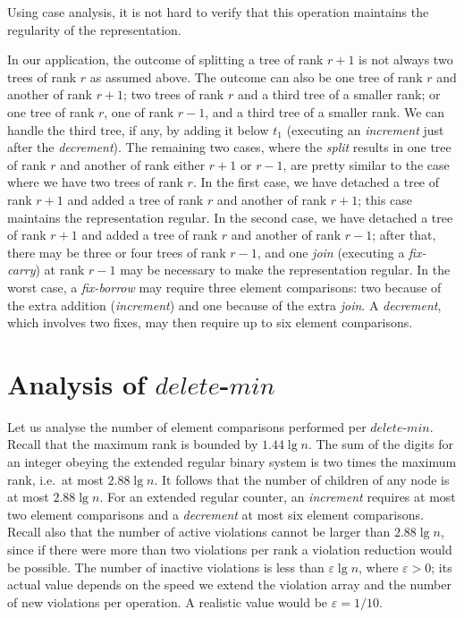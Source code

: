 \documentclass{llncs}
\newcommand{\Deletemin}{\mbox{$\mathit{delete}$\mbox{\rm -}$\mathit{min}$}}
\begin{document}
\noindent
Using case analysis, it is not hard to verify that this operation maintains the
regularity of the representation.

In our application, the outcome of splitting a tree of rank $r+1$ 
is not always two trees of rank $r$ as assumed above. The
outcome can also be one tree of rank $r$ and another of rank $r+1$;
two trees of rank $r$ and a third tree of a smaller rank; or one
tree of rank $r$, one of rank $r-1$, and a third tree of a smaller
rank. We can handle the third tree, if any, by adding it 
below $t_1$ (executing an \emph{increment} just after the \emph{decrement}).  
The remaining two cases, where the {\it split} results in one
tree of rank $r$ and another of rank either $r+1$ or $r-1$, 
are pretty similar to the case where we have two trees of rank $r$. 
In the first case, we have detached a tree of rank $r+1$ and added a tree of rank $r$ 
and another of rank $r+1$; this case maintains the representation regular. 
In the second case, we have detached a tree of rank $r+1$ and added a tree of rank $r$ 
and another of rank $r-1$; after that, there may be three or four trees of rank $r-1$, 
and one {\it join} (executing a {\it fix-carry}) at rank $r-1$ may be necessary to make the representation regular.  
In the worst case, a \emph{fix-borrow} may require three element comparisons: 
two because of the extra addition (\emph{increment}) and one because of the extra \emph{join}.
A \emph{decrement}, which involves two fixes, may then require up to 
six element comparisons.

\section{Analysis of \Deletemin{}}

Let us analyse the number of element comparisons performed per
\Deletemin{}.  Recall that the maximum rank is bounded by $1.44 \lg
n$.  The sum of the digits for an integer obeying the extended regular
binary system is two times the maximum rank, i.e.~at most $2.88 \lg
n$.  It follows that the number of children of any node is at most
$2.88 \lg n$.  For an extended regular counter, an {\it increment} requires at
most two element comparisons and a {\it decrement} at most six element
comparisons. Recall also that the number of active violations cannot
be larger than $2.88 \lg n$, since if there were more than two
violations per rank a violation reduction would be possible. The
number of inactive violations is less than $\varepsilon \lg n$, where
$\varepsilon > 0$; its actual value depends on the speed we extend the
violation array and the number of new violations per operation. A
realistic value would be $\varepsilon = 1/10$.
\end{document}
